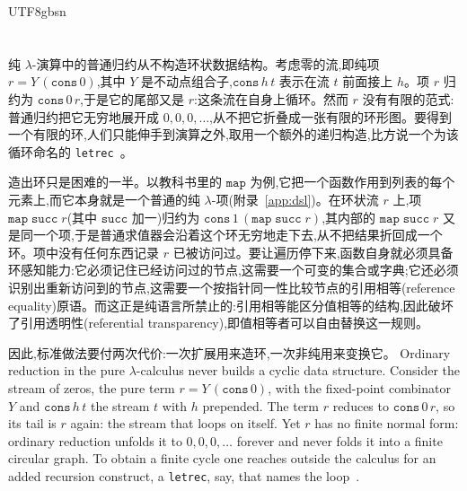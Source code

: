 \begin{CJK*}{UTF8}{gbsn}
  \maketitle

  \ifTablambdaBody
  \section{}\label{sec:intro}

  \subsection{}

  \ifTablambdaChinese
  纯 $\lambda$-演算中的普通归约从不构造环状数据结构。考虑零的流,即纯项 $r = Y\,(\mathtt{cons}\,0)$,其中 $Y$ 是不动点组合子,$\mathtt{cons}\,h\,t$ 表示在流 $t$ 前面接上 $h$。项 $r$ 归约为 $\mathtt{cons}\,0\,r$,于是它的尾部又是 $r$:这条流在自身上循环。然而 $r$ 没有有限的范式:普通归约把它无穷地展开成 $0,0,0,\dots$,从不把它折叠成一张有限的环形图。要得到一个有限的环,人们只能伸手到演算之外,取用一个额外的递归构造,比方说一个为该循环命名的 \texttt{letrec}~\cite{ariola1997-explicit-recursion}。

  造出环只是困难的一半。以教科书里的 $\mathtt{map}$ 为例,它把一个函数作用到列表的每个元素上,而它本身就是一个普通的纯 $\lambda$-项(附录~\ref{app:dsl})。在环状流 $r$ 上,项 $\mathtt{map}\;\mathtt{succ}\;r$(其中 $\mathtt{succ}$ 加一)归约为 $\mathtt{cons}\,1\,(\mathtt{map}\;\mathtt{succ}\;r)$,其内部的 $\mathtt{map}\;\mathtt{succ}\;r$ 又是同一个项,于是普通求值器会沿着这个环无穷地走下去,从不把结果折回成一个环。项中没有任何东西记录 $r$ 已被访问过。要让遍历停下来,函数自身就必须具备环感知能力:它必须记住已经访问过的节点,这需要一个可变的集合或字典;它还必须识别出重新访问到的节点,这需要一个按指针同一性比较节点的引用相等(reference equality)原语。而这正是纯语言所禁止的:引用相等能区分值相等的结构,因此破坏了引用透明性(referential transparency),即值相等者可以自由替换这一规则。

  因此,标准做法要付两次代价:一次扩展用来造环,一次非纯用来变换它。
  \else
  Ordinary reduction in the pure $\lambda$-calculus never builds a cyclic data structure. Consider the stream of zeros, the pure term $r = Y\,(\mathtt{cons}\,0)$, with the fixed-point combinator $Y$ and $\mathtt{cons}\,h\,t$ the stream $t$ with $h$ prepended. The term $r$ reduces to $\mathtt{cons}\,0\,r$, so its tail is $r$ again: the stream that loops on itself. Yet $r$ has no finite normal form: ordinary reduction unfolds it to $0,0,0,\dots$ forever and never folds it into a finite circular graph. To obtain a finite cycle one reaches outside the calculus for an added recursion construct, a \texttt{letrec}, say, that names the loop~\cite{ariola1997-explicit-recursion}.


\end{CJK*}

